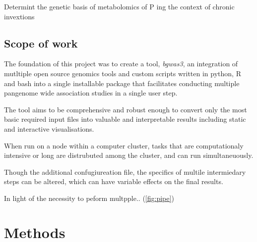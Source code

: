\documentclass[]{article}
\begin{document}
Determint the genetic basis of metabolomics of P ing the context of
chronic invextions

\hypertarget{scope-of-work}{%
\subsection{Scope of work}\label{scope-of-work}}

The foundation of this project was to create a tool, \emph{bgwas3}, an
integration of mutltiple open source genomics tools and custom scripts
written in python, R and bash into a single installable package that
facilitates conducting multiple pangenome wide association studies in a
single user step.

The tool aims to be comprehensive and robust enough to convert only the
most basic required input files into valuable and interpretable results
including static and interactive visualisations.

When run on a node within a computer cluster, tasks that are
computationaly intensive or long are distrubuted among the cluster, and
can run simultaneuously.

Though the additional confugiureation file, the specifics of multile
intermiedary steps can be altered, which can have variable effects on
the final results.

In light of the necessity to peform multpple.. (\ref{fig:pipe})

\hypertarget{methods}{%
\section{Methods}\label{methods}}
\end{document}
